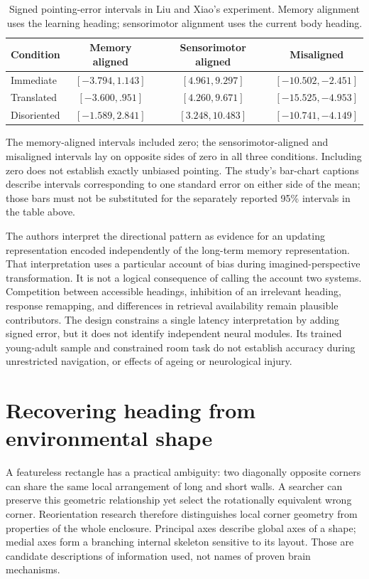 \begin{table}[htbp]
\centering
\small
\caption{Signed pointing-error intervals in Liu and Xiao's experiment.
Memory alignment uses the learning heading; sensorimotor alignment
uses the current body heading.}
\label{tab:p19-spu-bias}
\begin{tabular}{lccc}
\hline
Condition & Memory aligned & Sensorimotor aligned & Misaligned\\
\hline
Immediate & \([-3.794,1.143]\) & \([4.961,9.297]\) & \([-10.502,-2.451]\)\\
Translated & \([-3.600,.951]\) & \([4.260,9.671]\) & \([-15.525,-4.953]\)\\
Disoriented & \([-1.589,2.841]\) & \([3.248,10.483]\) & \([-10.741,-4.149]\)\\
\hline
\end{tabular}
\end{table}

The memory-aligned intervals included zero; the sensorimotor-aligned
and misaligned intervals lay on opposite sides of zero in all three
conditions. Including zero does not establish exactly unbiased
pointing. The study's bar-chart captions describe intervals
corresponding to one standard error on either side of the mean;
those bars must not be substituted for the separately reported
95\% intervals in the table above.

The authors interpret the directional pattern as evidence for an
updating representation encoded independently of the long-term
memory representation. That interpretation uses a particular account
of bias during imagined-perspective transformation. It is not a
logical consequence of calling the account two systems.
Competition between accessible headings, inhibition of an irrelevant
heading, response remapping, and differences in retrieval availability
remain plausible contributors. The design constrains a single
latency interpretation by adding signed error, but it does not
identify independent neural modules. Its trained young-adult sample
and constrained room task do not establish accuracy during unrestricted
navigation, or effects of ageing or neurological injury.

\section{Recovering heading from environmental shape}
\label{sec:p19-spu-geometry}

A featureless rectangle has a practical ambiguity: two diagonally
opposite corners can share the same local arrangement of long and
short walls. A searcher can preserve this geometric relationship yet
select the rotationally equivalent wrong corner. Reorientation research
therefore distinguishes local corner geometry from properties of the
whole enclosure. Principal axes describe global axes of a shape;
medial axes form a branching internal skeleton sensitive to its
layout. Those are candidate descriptions of information used, not
names of proven brain mechanisms.

